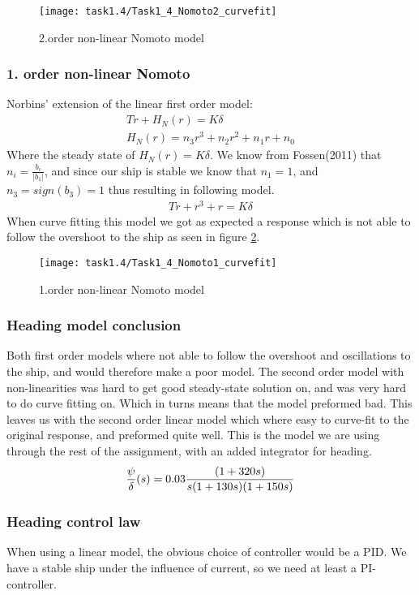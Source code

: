 \begin{figure}[H]
    \centering
    \texttt{[image: task1.4/Task1\_4\_Nomoto2\_curvefit]}
    \caption{2.order non-linear Nomoto model}
    \label{fig:nomoto2_nonlin}
\end{figure}

\subsubsection*{1. order non-linear Nomoto}
Norbins' extension of the linear first order model:
\begin{equation}
\begin{split}
	T\dot{r}+H_N(r)=K\delta \\
	H_N(r) = n_3r^3 + n_2r^2 + n_1r + n_0
\end{split}
\end{equation}
Where the steady state of $H_N(r)=K\delta$. We know from Fossen(2011) that $n_i = \frac{b_i}{|b_1|}$, and since our ship is stable we know that $n_1=1$, and $n_3 = sign(b_3)=1$ thus resulting in following model.
\begin{equation}
\begin{split}
	T\dot{r}+r^3 + r=K\delta 
\end{split}
\end{equation}
When curve fitting this model we got as expected a response which is not able to follow the overshoot to the ship as seen in figure \ref{fig:nomoto1_nonlin}.

\begin{figure}[H]
    \centering
    \texttt{[image: task1.4/Task1\_4\_Nomoto1\_curvefit]}
    \caption{1.order non-linear Nomoto model}
    \label{fig:nomoto1_nonlin}
\end{figure}

\subsubsection*{Heading model conclusion}
Both first order models where not able to follow the overshoot and oscillations to the ship, and would therefore make a poor model. The second order model with non-linearities was hard to get good steady-state solution on, and was very hard to do curve fitting on. Which in turns means that the model preformed bad. This leaves us with the second order linear model which where easy to curve-fit to the original response, and preformed quite well. This is the model we are using through the rest of the assignment, with an added integrator for heading. 
\begin{equation}
    \frac{\psi}{\delta}(s) =0.03 \frac{(1+320 s)}{s(1+130 s) (1+150 s) } \\
\end{equation}

\subsubsection*{Heading control law}
When using a linear model, the obvious choice of controller would be a PID. We have a stable ship under the influence of current, so we need at least a PI-controller.